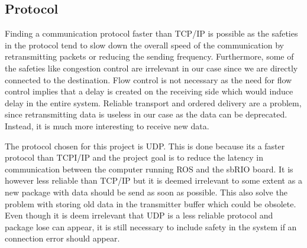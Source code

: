 \subsection{Protocol}\label{sec:Protocol}

Finding a communication protocol faster than TCP/IP is possible as the safeties in the protocol tend to slow down the overall speed of the communication by retransmitting packets or reducing the sending frequency\cite{TCP_IETF}. Furthermore, some of the safeties like congestion control are irrelevant in our case since we are directly connected to the destination. Flow control is not necessary as the need for flow control implies that a delay is created on the receiving side which would induce delay in the entire system. Reliable transport and ordered delivery are a problem, since retransmitting data is useless in our case as the data can be deprecated. Instead, it is much more interesting to receive new data. 

The protocol chosen for this project is \gls{UDP}. This is done because its a faster protocol than TCPI/IP and the project goal is to reduce the latency in communication between the computer running ROS and the sbRIO board. It is however less reliable than TCP/IP but it is deemed irrelevant to some extent as a new package with data should be send as soon as possible. This also solve the problem with storing old data in the transmitter buffer which could be obsolete. Even though it is deem irrelevant that \gls{UDP} is a less reliable protocol and package lose can appear, it is still necessary to include safety in the system if an connection error should appear.  





